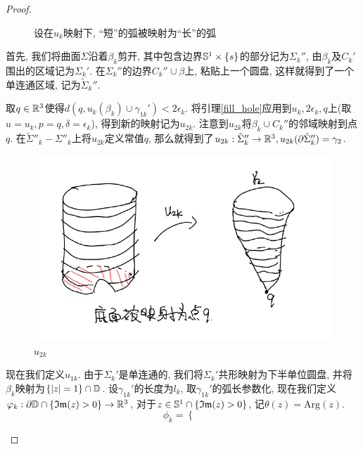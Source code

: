 \begin{proof}
\begin{claim}
\begin{subproof}
\begin{figure}[ht]
                \caption{设在$u_k$映射下, ``短''的弧被映射为``长''的弧}
                \label{pinch}
            \end{figure}
            \par 首先, 我们将曲面$\Sigma$沿着$\beta_k$剪开, 其中包含边界$\S^1\times \{s\}$的部分记为$\Sigma_k''$, 由$\beta_k$及$C_k'$围出的区域记为$\Sigma_k'$. 在$\Sigma_k''$的边界$C_k''\cup \beta$上, 粘贴上一个圆盘, 这样就得到了一个单连通区域, 记为$\tilde{\Sigma}_k''$.  %
            \par 取$q \in \R^3$使得$d(q, u_k(\beta_k) \cup \gamma_{1k}') < 2\epsilon_k$.  将引理\eqref{fill_hole}应用到$u_k, 2\epsilon_k, q$上(取$u=u_k, p=q, \delta=\epsilon_k$), 得到新的映射记为$u_{2k}$. 注意到$u_{2k}$将$\beta_k \cup C_k''$的邻域映射到点$q$. 在$\tilde{\Sigma}''_k-\Sigma''_k$上将$u_{2k}$定义常值$q$, 那么就得到了$u_{2k}: \tilde{\Sigma}_k'' \to \R^3, u_{2k}({\P \tilde{\Sigma}_k''})=\gamma_2$.
            \begin{figure}[ht]
                \centering
                \includegraphics[scale=0.7]{images/u2k.png}
                \caption{$u_{2k}$}
                \label{u2k}
            \end{figure}
            \par  现在我们定义$u_{1k}$. 由于$\Sigma_k'$是单连通的, 我们将$\Sigma_k'$共形映射为下半单位圆盘, 并将$\beta_k$映射为$\{\abs{z}=1\} \cap \D$.  设$\gamma_{1k}'$的长度为$l_k$, 取$\gamma_{1k}'$的弧长参数化, 现在我们定义$\phi_k: \P \D \cap \{\Im(z)>0\} \to \R^3$, 对于$z \in \S^1 \cap \{\Im(z) >0\}$, 记$\theta(z)=\text{Arg}(z)$.
            \begin{equation}
                \phi_k=\left\{
                    \begin{aligned}

\end{aligned}
\end{equation}
\end{subproof}
\end{claim}
\end{proof}
